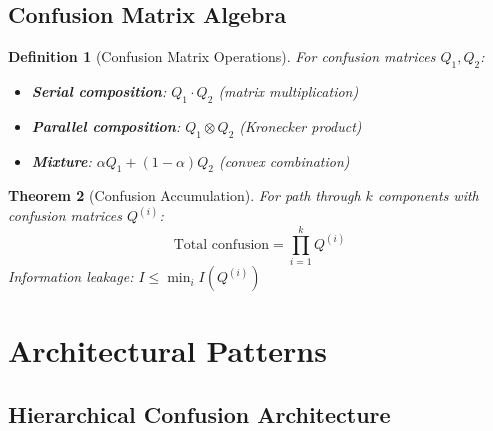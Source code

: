 \documentclass[11pt,final]{article}
\newtheorem{theorem}{Theorem}[section]
\newtheorem{definition}[theorem]{Definition}
\begin{document}
\subsection{Confusion Matrix Algebra}

\begin{definition}[Confusion Matrix Operations]
For confusion matrices $Q_1, Q_2$:
\begin{itemize}
    \item \textbf{Serial composition}: $Q_1 \cdot Q_2$ (matrix multiplication)
    \item \textbf{Parallel composition}: $Q_1 \otimes Q_2$ (Kronecker product)
    \item \textbf{Mixture}: $\alpha Q_1 + (1-\alpha) Q_2$ (convex combination)
\end{itemize}
\end{definition}

\begin{theorem}[Confusion Accumulation]
For path through $k$ components with confusion matrices $Q^{(i)}$:
\begin{equation}
\text{Total confusion} = \prod_{i=1}^k Q^{(i)}
\end{equation}
Information leakage: $I \leq \min_i I(Q^{(i)})$
\end{theorem}

\section{Architectural Patterns}

\subsection{Hierarchical Confusion Architecture}
\end{document}
